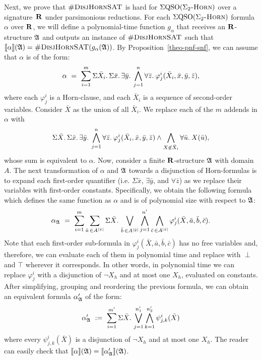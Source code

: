 Next, we prove that $\textsc{\#DisjHornSAT}$ is hard for $\Sigma{\rm QSO}(\Sigma_2\textsc{-Horn})$ over a signature~$\mathbf{R}$ under parsimonious reductions. For each $\Sigma{\rm QSO}(\Sigma_2\textsc{-Horn})$ formula $\alpha$ over $\mathbf{R}$, we will define a polynomial-time function $g_{\alpha}$ that receives an $\mathbf{R}$-structure $\mathfrak{A}$ and outputs an instance of $\textsc{\#DisjHornSAT}$ such that ${\llbracket{}{\alpha}\rrbracket}(\mathfrak{A}) = \textsc{\#DisjHornSAT}(g_{\alpha}(\mathfrak{A}))$. By Proposition~\ref{theo-pnf-snf}, we can assume that $\alpha$ is of the form:
$$
\alpha \ = \ \sum_{i = 1}^{m} \Sigma{\bar{X}_{i}}.\,\Sigma{\bar{x}}.\, \exists{\bar{y}}.\: \bigwedge_{j = 1}^{n} \forall{\bar{z}}.\: \varphi^i_j(\bar{X}_{i},\bar{x},\bar{y},\bar{z}),
$$
where each $\varphi^i_j$ is a Horn-clause, and each $\bar{X}_{i}$ is a sequence of second-order variables.
Consider $\bar{X}$ as the union of all $\bar{X}_{i}$. We replace each of the $m$ addends in $\alpha$ with
$$
\Sigma{\bar{X}}.\,\Sigma{\bar{x}}.\, \exists{\bar{y}}.\: \bigwedge_{j = 1}^{n} \forall{\bar{z}}.\: \varphi^i_j(\bar{X}_{i},\bar{x},\bar{y},\bar{z})\wedge\bigwedge_{X\not\in\bar{X}_{i}}\forall{\bar{u}}.\:X(\bar{u}),
$$
whose sum is equivalent to $\alpha$.
Now, consider a finite $\mathbf{R}$-structure $\mathfrak{A}$ with domain $A$. 
The next transformation of $\alpha$ and $\mathfrak{A}$ towards a disjunction of Horn-formulas is to expand each first-order quantifier (i.e. $\Sigma{\bar{x}}$,  $\exists\bar{y}$, and $\forall\bar{z}$) as we replace their variables with first-order constants. Specifically, we obtain the following formula which defines the same function as $\alpha$ and is of polynomial size with respect to $\mathfrak{A}$:
$$
\alpha_{\mathfrak{A}} \ = \ \sum_{i = 1}^{m} \sum_{\bar{a}\,\in A^{\vert \bar{x} \vert}} \Sigma{\bar{X}}.\,\bigvee_{\bar{b}\,\in A^{\vert \bar{y} \vert}}\bigwedge_{j = 1}^{n'}\bigwedge_{\bar{c}\,\in A^{\vert \bar{z} \vert}}\varphi^i_j(\bar{X},\bar{a},\bar{b},\bar{c}).
$$
Note that each first-order sub-formula in $\varphi^i_j(\bar{X},\bar{a},\bar{b},\bar{c})$ has no free variables and, therefore, we can evaluate each of them in polynomial time and replace with $\perp$ and $\top$ wherever it corresponds. In other words, in polynomial time we can replace $\varphi^i_j$ with a disjunction of $\neg X_{h}$ and at most one $X_{h}$, evaluated on constants.
After simplifying, grouping and reordering the previous formula, we can obtain an equivalent formula $\alpha_{\mathfrak{A}}'$ of the form:
$$
\alpha_{\mathfrak{A}}' \ := \ \sum_{i = 1}^{m'}\Sigma{\bar{X}}.\,\bigvee_{j = 1}^{n_1'}\bigwedge_{k = 1}^{n_2'}\psi^{i}_{j,k}(\bar{X})
$$
where every $\psi^{i}_{j,k}(\bar{X})$ is a disjunction of $\neg X_{h}$ and at most one $X_{h}$.
The reader can easily check that ${\llbracket{}{\alpha}\rrbracket}(\mathfrak{A}) = {\llbracket{}{\alpha_{\mathfrak{A}}'}\rrbracket}(\mathfrak{A})$. 

